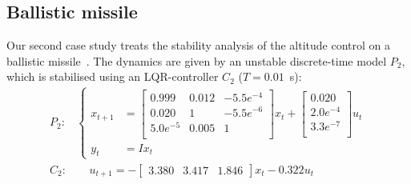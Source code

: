 \subsection{Ballistic missile}\label{sec:eval:unstable}
Our second case study treats the stability analysis of the altitude control on a ballistic missile~\cite{Blakelock:1991, Sree:2006}.
The dynamics are given by an unstable discrete-time model $P_2$, which is stabilised using an LQR-controller $C_2$ ($T = 0.01$~s):
\begin{equation*}%
    {
    \begin{aligned}
        P_2: &
        \begin{cases}
            x_{t+1} &= \begin{bmatrix}
                0.999 & 0.012 & -5.5 e^{-4} \\
                0.020 & 1 & -5.5 e^{-6} \\
                5.0 e^{-5} & 0.005 & 1 \\
            \end{bmatrix} x_t + \begin{bmatrix}
                0.020 \\
                2.0e^{-4} \\
                3.3e^{-7} \\
            \end{bmatrix}u_t \\
            y_t &= I x_t
        \end{cases} \\
        C_2: & \quad\, u_{t+1} = -\begin{bmatrix}
            3.380 & 3.417 & 1.846
        \end{bmatrix} x_t - 0.322 u_t
    \end{aligned}
    }
\end{equation*}

